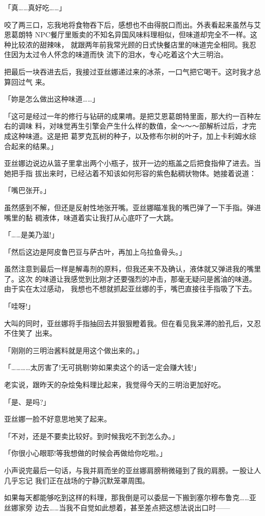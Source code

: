 \documentclass[11pt]{book}
\begin{document}
「真……真好吃……」

咬了两三口，忘我地将食物吞下后，感想也不由得脱口而出。外表看起来虽然与艾恩葛朗特
NPC餐厅里贩卖的不知名异国风味料理相似，但味道却完全不一样。这种比较浓的甜辣味，
就跟两年前我常光顾的日式快餐店里的味道完全相同。我忍住因为太过令人怀念的味道而快
流下的泪水，专心吃着这个大三明治。

把最后一块吞进去后，我接过亚丝娜递过来的冰茶，一口气把它喝干。这时我才总算回过气
来。

「妳是怎么做出这种味道……」

「这可是经过一年的修行与钻研的成果唷。是把艾恩葛朗特里面，那大约一百种左右的调味
料，对味觉再生引擎会产生什么样的数值，全～～～部解析过后，才完成这种味道。这是把
葛罗克瓦树的种子，以及修布尔树的叶子，加上卡利姆水综合起来的结果。」

亚丝娜边说边从篮子里拿出两个小瓶子，拔开一边的瓶盖之后把食指伸了进去。当她把手指
拔出来时，已经沾着不知该如何形容的紫色黏稠状物体。她接着说道：

「嘴巴张开。」

虽然感到不解，但还是反射性地张开嘴。亚丝娜瞄准我的嘴巴弹了一下手指。弹进嘴里的黏
稠液体，味道着实让我打从心底吓了一大跳。

「……是美乃滋!」

「然后这边是阿皮鲁巴豆与萨古叶，再加上乌拉鱼骨头。」

虽然注意到最后一样是解毒剂的原料，但我还来不及确认，液体就又弹进我的嘴里了。这次
的味道让我感觉到比刚才还要强烈的冲击，那毫无疑问是酱油的味道。由于实在太过感动，
我想也不想就抓起亚丝娜的手，嘴巴直接往手指吸了下去。

「哇呀!」

大叫的同时，亚丝娜将手指抽回去并狠狠瞪着我。但在看见我呆滞的脸孔后，又忍不住笑了
出来。

「刚刚的三明治酱料就是用这个做出来的。」

「…………太厉害了!无可挑剔!妳如果卖这个的话一定会赚大钱!」

老实说，跟昨天的杂烩兔料理比起来，我觉得今天的三明治更加好吃。

「是、是吗?」

亚丝娜一脸不好意思地笑了起来。

「不对，还是不要卖比较好。到时候我吃不到怎么办。」

「你很小心眼耶!等我想做的时候会再做给你吃啦。」

小声说完最后一句话，与我并肩而坐的亚丝娜肩膀稍微碰到了我的肩膀。一股让人几乎忘记
我们正在战场的宁静沉默笼罩周围。

如果每天都能够吃到这样的料理，那我倒是可以委屈一下搬到塞尔穆布鲁克……亚丝娜家旁
边去……当我不自觉如此想着，甚至差点把这想法说出口时——
\end{document}
